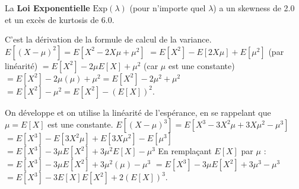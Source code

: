 \begin{correctionbox}
La \textbf{Loi Exponentielle} $\text{Exp}(\lambda)$ (pour n'importe quel $\lambda$) a un skewness de 2.0 et un excès de kurtosis de 6.0.
\end{correctionbox}

\begin{correctionbox}
C'est la dérivation de la formule de calcul de la variance.
$E[(X-\mu)^2] = E[X^2 - 2X\mu + \mu^2]$
$= E[X^2] - E[2X\mu] + E[\mu^2]$ (par linéarité)
$= E[X^2] - 2\mu E[X] + \mu^2$ (car $\mu$ est une constante)
$= E[X^2] - 2\mu(\mu) + \mu^2 = E[X^2] - 2\mu^2 + \mu^2$
$= E[X^2] - \mu^2 = E[X^2] - (E[X])^2$.
\end{correctionbox}

\begin{correctionbox}
On développe et on utilise la linéarité de l'espérance, en se rappelant que $\mu=E[X]$ est une constante.
$E[(X-\mu)^3] = E[X^3 - 3X^2\mu + 3X\mu^2 - \mu^3]$
$= E[X^3] - E[3X^2\mu] + E[3X\mu^2] - E[\mu^3]$
$= E[X^3] - 3\mu E[X^2] + 3\mu^2 E[X] - \mu^3$
En remplaçant $E[X]$ par $\mu$ :
$= E[X^3] - 3\mu E[X^2] + 3\mu^2(\mu) - \mu^3$
$= E[X^3] - 3\mu E[X^2] + 3\mu^3 - \mu^3$
$= E[X^3] - 3E[X]E[X^2] + 2(E[X])^3$.
\end{correctionbox}